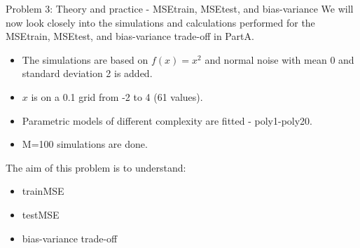 \documentclass[ignorenonframetext,]{beamer}
\providecommand{\tightlist}{%
  \setlength{\itemsep}{0pt}\setlength{\parskip}{0pt}}
\begin{document}
\begin{frame}[fragile]
\begin{block}{Problem 3: Theory and practice - MSEtrain, MSEtest, and
bias-variance}
We will now look closely into the simulations and calculations performed
for the MSEtrain, MSEtest, and bias-variance trade-off in PartA.

\begin{itemize}
\tightlist
\item
  The simulations are based on \(f(x)=x^2\) and normal noise with mean 0
  and standard deviation 2 is added.
\item
  \(x\) is on a 0.1 grid from -2 to 4 (61 values).
\item
  Parametric models of different complexity are fitted - poly1-poly20.
\item
  M=100 simulations are done.
\end{itemize}

The aim of this problem is to understand:

\begin{itemize}
\tightlist
\item
  trainMSE
\item
  testMSE
\item
  bias-variance trade-off
\end{itemize}

\end{block}

\end{frame}
\end{document}
